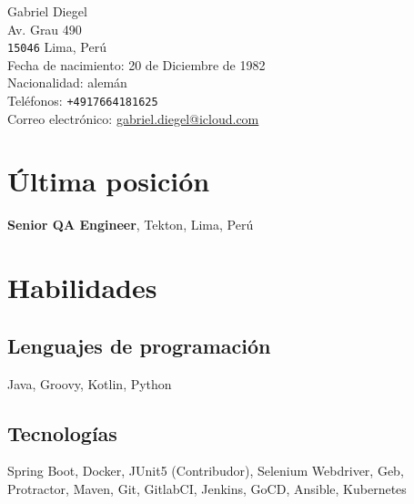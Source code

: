 \documentclass[10pt, a4paper]{article}
\begin{document}
{\LARGE Gabriel Diegel}\\[1cm]
Av. Grau 490\\
\texttt{15046} Lima, Perú\\[.2cm]
Fecha de nacimiento: 20 de Diciembre de 1982\\
Nacionalidad: alemán\\[.2cm]
Teléfonos: \texttt{+4917664181625}\\
Correo electrónico: \href{mailto:gabriel.diegel@icloud.com}{gabriel.diegel@icloud.com}\\

\section*{Última posición}
{\bf Senior QA Engineer}, Tekton, Lima, Perú

\section*{Habilidades}
\subsection*{Lenguajes de programación}
Java, Groovy, Kotlin, Python
\subsection*{Tecnologías}
Spring Boot, Docker, JUnit5 (Contribudor), Selenium Webdriver, Geb, Protractor, Maven, Git, GitlabCI, Jenkins, GoCD, Ansible, Kubernetes

\end{document}
